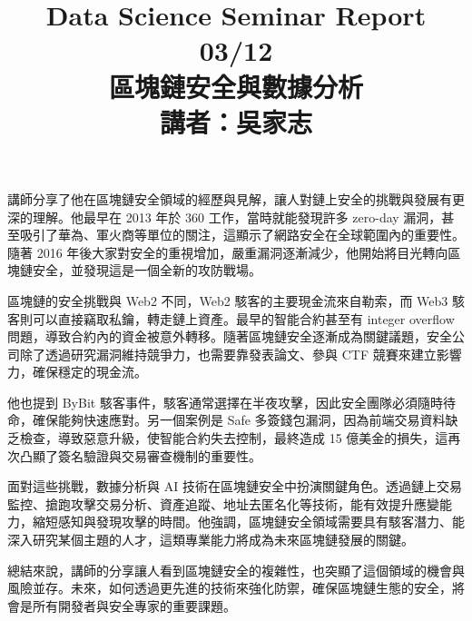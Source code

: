 \documentclass{homework}
\begin{document}
\title{Data Science Seminar Report 03/12 \\ 區塊鏈安全與數據分析 \\ 講者：吳家志}
\author{\chineseName \masterStudentID}
\date{}
\maketitle

講師分享了他在區塊鏈安全領域的經歷與見解，讓人對鏈上安全的挑戰與發展有更深的理解。他最早在 2013 年於 360 工作，當時就能發現許多 zero-day 漏洞，甚至吸引了華為、軍火商等單位的關注，這顯示了網路安全在全球範圍內的重要性。隨著 2016 年後大家對安全的重視增加，嚴重漏洞逐漸減少，他開始將目光轉向區塊鏈安全，並發現這是一個全新的攻防戰場。

區塊鏈的安全挑戰與 Web2 不同，Web2 駭客的主要現金流來自勒索，而 Web3 駭客則可以直接竊取私鑰，轉走鏈上資產。最早的智能合約甚至有 integer overflow 問題，導致合約內的資金被意外轉移。隨著區塊鏈安全逐漸成為關鍵議題，安全公司除了透過研究漏洞維持競爭力，也需要靠發表論文、參與 CTF 競賽來建立影響力，確保穩定的現金流。

他也提到 ByBit 駭客事件，駭客通常選擇在半夜攻擊，因此安全團隊必須隨時待命，確保能夠快速應對。另一個案例是 Safe 多簽錢包漏洞，因為前端交易資料缺乏檢查，導致惡意升級，使智能合約失去控制，最終造成 15 億美金的損失，這再次凸顯了簽名驗證與交易審查機制的重要性。

面對這些挑戰，數據分析與 AI 技術在區塊鏈安全中扮演關鍵角色。透過鏈上交易監控、搶跑攻擊交易分析、資產追蹤、地址去匿名化等技術，能有效提升應變能力，縮短感知與發現攻擊的時間。他強調，區塊鏈安全領域需要具有駭客潛力、能深入研究某個主題的人才，這類專業能力將成為未來區塊鏈發展的關鍵。

總結來說，講師的分享讓人看到區塊鏈安全的複雜性，也突顯了這個領域的機會與風險並存。未來，如何透過更先進的技術來強化防禦，確保區塊鏈生態的安全，將會是所有開發者與安全專家的重要課題。
\end{document}
